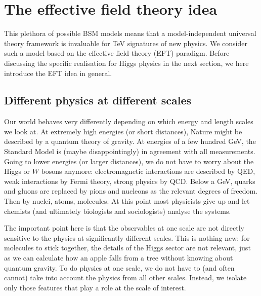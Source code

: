 \section{The effective field theory idea}
\label{sec:foundations_eft}

This plethora of possible BSM models means that a model-independent
universal theory framework is invaluable for TeV signatures of new
physics. We consider such a model based on the effective field theory
(EFT) paradigm. Before discussing the specific realisation for Higgs
physics in the next section, we here introduce the EFT idea in
general.




\subsection{Different physics at different scales}
\label{sec:foundations_scales}

Our world behaves very differently depending on which energy and
length scales we look at. At extremely high energies (or short
distances), Nature might be described by a quantum theory of
gravity. At energies of a few hundred GeV, the Standard Model is
(maybe disappointingly) in agreement with all measurements. Going to lower
energies (or larger distances), we do not have to worry about the Higgs or
$W$ bosons anymore: electromagnetic interactions are described by QED,
weak interactions by Fermi theory, strong physics by QCD. Below a GeV,
quarks and gluons are replaced by pions and nucleons as the relevant
degrees of freedom. Then by nuclei, atoms, molecules. At this point
most physicists give up and let chemists (and ultimately biologists
and sociologists) analyse the systems.

The important point here is that the observables at one scale are not
directly sensitive to the physics at significantly different
scales. This is nothing new: for molecules to stick together, the
details of the Higgs sector are not relevant, just as we can calculate how
an apple falls from a tree without knowing about quantum gravity. To
do physics at one scale, we do not have to (and often cannot) take
into account the physics from all other scales. Instead, we isolate
only those features that play a role at the scale of interest.

